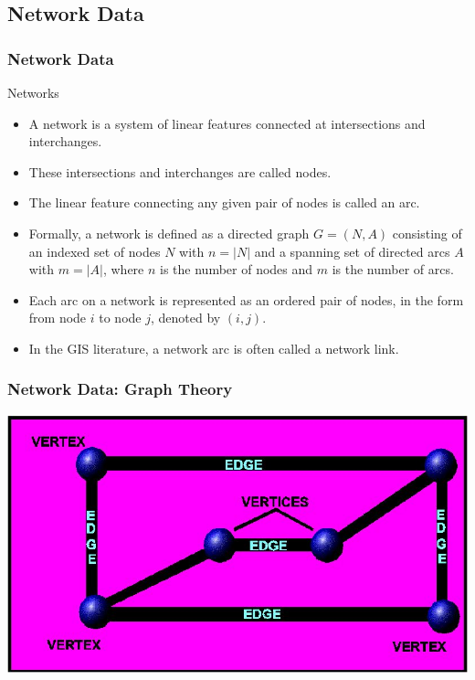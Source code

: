 \documentclass[nototal]{beamer}
\begin{document}
  \subsection{Network Data}
\begin{frame}[<+->]
  \frametitle{Network Data}
  \begin{block}{Networks} \begin{itemize} \item 	 A network is a system
      of linear features connected at intersections and interchanges.  \item
      These intersections and interchanges are called nodes.  \item 	The
      linear feature connecting any given pair of nodes is called an arc.
    \item 	Formally, a network is defined as a directed graph $G = (N,
      A)$ consisting of an indexed set of nodes $N$ with $n = |N|$ and a spanning
      set of directed arcs $A$ with $m = |A|$, where $n$ is the number of nodes and
      $m$ is the number of arcs.
  \item 	 Each arc on a network is represented as an ordered pair of
    nodes, in the form from node $i$ to node $j$, denoted by $(i, j)$.
  \item 	In the GIS literature, a network arc is often called a network link.
    \end{itemize}
   \end{block}
 \end{frame}

\begin{frame}
    \frametitle{Network Data: Graph Theory}
    \begin{center}
     \includegraphics[width=.65\linewidth]{graph.jpg}
   \end{center}
\end{frame}
\end{document}
